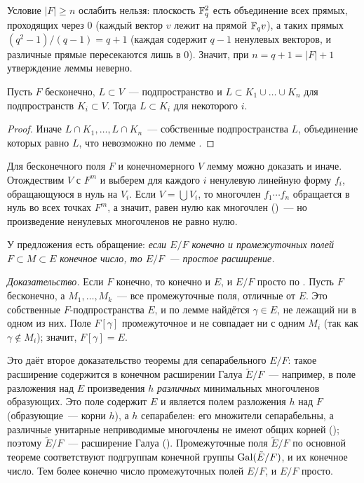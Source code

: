 Условие $|F|\ge n$ ослабить нельзя: плоскость $\mathbb F_q^2$ есть объединение всех прямых, проходящих через $0$ (каждый
вектор $v$ лежит на прямой $\mathbb F_qv$), а таких прямых $(q^2-1)/(q-1)=q+1$ (каждая содержит $q-1$ ненулевых векторов, и
различные прямые пересекаются лишь в $0$). Значит, при $n=q+1=|F|+1$ утверждение леммы неверно.

\begin{corollary}[5.3c]
Пусть $F$ бесконечно, $L\subset V$~--- подпространство и $L\subset K_1\cup\dots\cup K_n$ для подпространств $K_i\subset V$.
Тогда $L\subset K_i$ для некоторого $i$.
\end{corollary}

\begin{proof}
Иначе $L\cap K_1,\dots,L\cap K_n$~--- собственные подпространства $L$, объединение которых равно $L$, что невозможно по
лемме .
\end{proof}

\begin{remark}
Для бесконечного поля $F$ и конечномерного $V$ лемму можно доказать и иначе. Отождествим $V$ с $F^m$ и выберем для каждого
$i$ ненулевую линейную форму $f_i$, обращающуюся в нуль на $V_i$. Если $V=\bigcup V_i$, то многочлен $f_1\cdots f_n$
обращается в нуль во всех точках $F^m$, а значит, равен нулю как многочлен ()~--- но произведение ненулевых
многочленов не равно нулю.
\end{remark}

\begin{remark}[5.4]
У предложения  есть обращение: \emph{если $E/F$ конечно и промежуточных полей $F\subset M\subset E$ конечное число, то
$E/F$~--- простое расширение.}

\emph{Доказательство.} Если $F$ конечно, то конечно и $E$, и $E/F$ просто по . Пусть $F$ бесконечно, а
$M_1,\dots,M_k$~--- все промежуточные поля, отличные от $E$. Это собственные $F$-подпространства $E$, и по лемме 
найдётся $\gamma\in E$, не лежащий ни в одном из них. Поле $F[\gamma]$ промежуточное и не совпадает ни с одним $M_i$
(так как $\gamma\notin M_i$); значит, $F[\gamma]=E$.

Это даёт второе доказательство теоремы  для сепарабельного $E/F$: такое расширение содержится в конечном
расширении Галуа $\tilde E/F$~--- например, в поле разложения над $E$ произведения $h$ \emph{различных} минимальных
многочленов образующих. Это поле содержит $E$ и является полем разложения $h$ над $F$ (образующие~--- корни $h$), а $h$
сепарабелен: его множители сепарабельны, а различные унитарные неприводимые многочлены не имеют общих корней ();
поэтому $\tilde E/F$~--- расширение Галуа (). Промежуточные поля $\tilde E/F$ по основной теореме соответствуют
подгруппам конечной группы $\operatorname{Gal}(\tilde E/F)$, и их конечное число. Тем более конечно число промежуточных полей $E/F$, и $E/F$ просто.
\end{remark}

